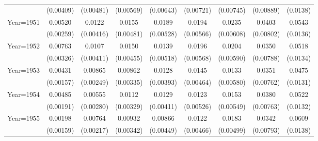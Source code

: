 \begin{table}[htbp]
\begin{tabular}{l*{8}{c}}
                    &   (0.00409)         &   (0.00481)         &   (0.00569)         &   (0.00643)         &   (0.00721)         &   (0.00745)         &   (0.00889)         &    (0.0138)         \\
[1em]
Year=1951           &     0.00520\sym{**} &      0.0122\sym{***}&      0.0155\sym{***}&      0.0189\sym{***}&      0.0194\sym{***}&      0.0235\sym{***}&      0.0403\sym{***}&      0.0543\sym{***}\\
                    &   (0.00259)         &   (0.00416)         &   (0.00481)         &   (0.00528)         &   (0.00566)         &   (0.00608)         &   (0.00802)         &    (0.0136)         \\
[1em]
Year=1952           &     0.00763\sym{**} &      0.0107\sym{***}&      0.0150\sym{***}&      0.0139\sym{***}&      0.0196\sym{***}&      0.0204\sym{***}&      0.0350\sym{***}&      0.0518\sym{***}\\
                    &   (0.00326)         &   (0.00411)         &   (0.00455)         &   (0.00518)         &   (0.00568)         &   (0.00590)         &   (0.00788)         &    (0.0134)         \\
[1em]
Year=1953           &     0.00431\sym{***}&     0.00865\sym{***}&     0.00862\sym{**} &      0.0128\sym{***}&      0.0145\sym{***}&      0.0133\sym{**} &      0.0351\sym{***}&      0.0475\sym{***}\\
                    &   (0.00157)         &   (0.00249)         &   (0.00335)         &   (0.00393)         &   (0.00464)         &   (0.00580)         &   (0.00762)         &    (0.0131)         \\
[1em]
Year=1954           &     0.00485\sym{**} &     0.00555\sym{**} &      0.0112\sym{***}&      0.0129\sym{***}&      0.0123\sym{**} &      0.0153\sym{***}&      0.0380\sym{***}&      0.0522\sym{***}\\
                    &   (0.00191)         &   (0.00280)         &   (0.00329)         &   (0.00411)         &   (0.00526)         &   (0.00549)         &   (0.00763)         &    (0.0132)         \\
[1em]
Year=1955           &     0.00198         &     0.00764\sym{***}&     0.00932\sym{***}&     0.00866\sym{*}  &      0.0122\sym{***}&      0.0183\sym{***}&      0.0342\sym{***}&      0.0609\sym{***}\\
                    &   (0.00159)         &   (0.00217)         &   (0.00342)         &   (0.00449)         &   (0.00466)         &   (0.00499)         &   (0.00793)         &    (0.0138)         \\

\end{tabular}
\end{table}
